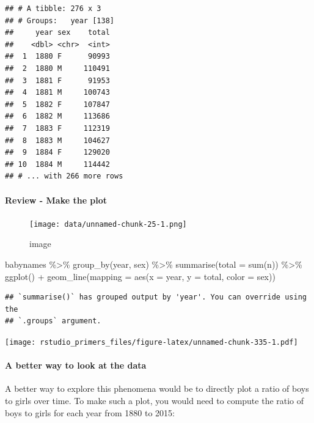 \documentclass[
]{article}
\newenvironment{Shaded}{\begin{snugshade}}{\end{snugshade}}
\newcommand{\AttributeTok}[1]{\textcolor[rgb]{0.77,0.63,0.00}{#1}}
\newcommand{\FunctionTok}[1]{\textcolor[rgb]{0.00,0.00,0.00}{#1}}
\newcommand{\NormalTok}[1]{#1}
\newcommand{\SpecialCharTok}[1]{\textcolor[rgb]{0.00,0.00,0.00}{#1}}
\begin{document}
\begin{verbatim}
## # A tibble: 276 x 3
## # Groups:   year [138]
##     year sex    total
##    <dbl> <chr>  <int>
##  1  1880 F      90993
##  2  1880 M     110491
##  3  1881 F      91953
##  4  1881 M     100743
##  5  1882 F     107847
##  6  1882 M     113686
##  7  1883 F     112319
##  8  1883 M     104627
##  9  1884 F     129020
## 10  1884 M     114442
## # ... with 266 more rows
\end{verbatim}

\hypertarget{review---make-the-plot}{%
\paragraph{Review - Make the plot}\label{review---make-the-plot}}

\begin{figure}
\centering
\texttt{[image: data/unnamed-chunk-25-1.png]}
\caption{image}
\end{figure}

\begin{Shaded}
\begin{Highlighting}[]
\NormalTok{babynames }\SpecialCharTok{\%\textgreater{}\%}
  \FunctionTok{group\_by}\NormalTok{(year, sex) }\SpecialCharTok{\%\textgreater{}\%} 
  \FunctionTok{summarise}\NormalTok{(}\AttributeTok{total =} \FunctionTok{sum}\NormalTok{(n))  }\SpecialCharTok{\%\textgreater{}\%}
  \FunctionTok{ggplot}\NormalTok{() }\SpecialCharTok{+}
    \FunctionTok{geom\_line}\NormalTok{(}\AttributeTok{mapping =} \FunctionTok{aes}\NormalTok{(}\AttributeTok{x =}\NormalTok{ year, }\AttributeTok{y =}\NormalTok{ total, }\AttributeTok{color =}\NormalTok{ sex))}
\end{Highlighting}
\end{Shaded}

\begin{verbatim}
## `summarise()` has grouped output by 'year'. You can override using the
## `.groups` argument.
\end{verbatim}

\texttt{[image: rstudio\_primers\_files/figure-latex/unnamed-chunk-335-1.pdf]}

\hypertarget{a-better-way-to-look-at-the-data}{%
\paragraph{A better way to look at the
data}\label{a-better-way-to-look-at-the-data}}

A better way to explore this phenomena would be to directly plot a ratio
of boys to girls over time. To make such a plot, you would need to
compute the ratio of boys to girls for each year from 1880 to 2015:
\end{document}
